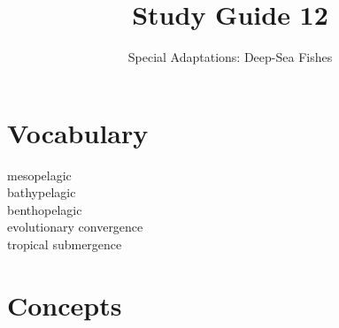 \documentclass[letterpaper]{tufte-handout}
\title{Study Guide 12}
\author{Special Adaptations: Deep-Sea Fishes}
\date{} %
\begin{document}
\maketitle	%


\section{Vocabulary} 
\vspace{-1\baselineskip}
\begin{multicols}{2}
mesopelagic \\
bathypelagic \\
benthopelagic \\
evolutionary convergence \\
tropical submergence
\end{multicols}

\section{Concepts}
\end{document}
